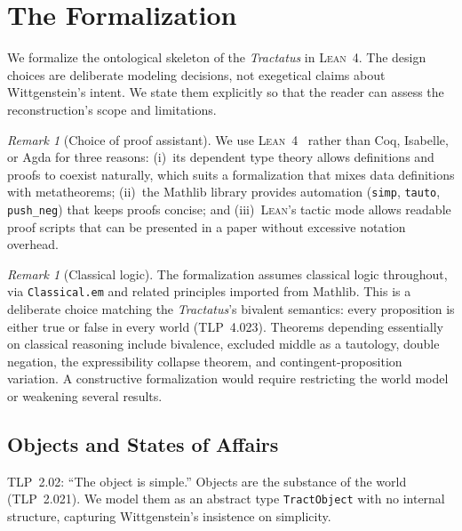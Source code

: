 \documentclass[10pt, letterpaper]{article}
\theoremstyle{definition}
\theoremstyle{remark}
\newtheorem{remark}[theorem]{Remark}
\newcommand{\Lean}{\textsc{Lean}}
\begin{document}
\section{The Formalization}
\label{sec:formalization}

We formalize the ontological skeleton of the \emph{Tractatus}
in \Lean~4.  The design choices are deliberate modeling
decisions, not exegetical claims about Wittgenstein's intent.
We state them explicitly so that the reader can assess the
reconstruction's scope and limitations.

\begin{remark}[Choice of proof assistant]
\label{rem:lean4}
We use \Lean~4~\cite{moura2021} rather than Coq, Isabelle, or
Agda for three reasons: (i)~its dependent type theory allows
definitions and proofs to coexist naturally, which suits a
formalization that mixes data definitions with metatheorems;
(ii)~the Mathlib library provides automation
(\texttt{simp}, \texttt{tauto}, \texttt{push\_neg}) that keeps
proofs concise; and (iii)~\Lean's tactic mode allows readable
proof scripts that can be presented in a paper without excessive
notation overhead.
\end{remark}

\begin{remark}[Classical logic]
\label{rem:classical}
The formalization assumes classical logic throughout, via
\texttt{Classical.em} and related principles imported from
Mathlib.  This is a deliberate choice matching the
\emph{Tractatus}'s bivalent semantics: every proposition is
either true or false in every world (TLP~4.023).
Theorems depending essentially on classical reasoning include
bivalence, excluded middle as a tautology, double negation,
the expressibility collapse theorem, and contingent-proposition
variation.  A constructive formalization would require
restricting the world model or weakening several results.
\end{remark}

\subsection{Objects and States of Affairs}
\label{sec:objects}

TLP~2.02: ``The object is simple.''  Objects are the substance
of the world (TLP~2.021).  We model them as an abstract type
\texttt{TractObject} with no internal structure, capturing
Wittgenstein's insistence on simplicity.
\end{document}

